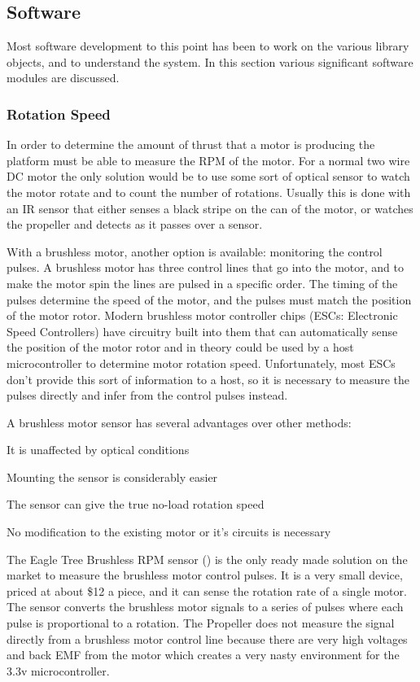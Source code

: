 \documentclass{article}
\numberwithin{equation}{section} %
\begin{document}
\subsection{Software}
Most software development to this point has been to work on the various library objects, and to understand the system. In this section various significant software modules are discussed.
\subsubsection{Rotation Speed}
In order to determine the amount of thrust that a motor is producing the platform must be able to measure the RPM of the motor. For a normal two wire DC motor the only solution would be to use some sort of optical sensor to watch the motor rotate and to count the number of rotations. Usually this is done with an IR sensor that either senses a black stripe on the can of the motor, or watches the propeller and detects as it passes over a sensor. 

With a brushless motor, another option is available: monitoring the control pulses. A brushless motor has three control lines that go into the motor, and to make the motor spin the lines are pulsed in a specific order. The  timing of the pulses determine the speed of the motor, and the pulses must match the position of the motor rotor. Modern brushless motor controller chips (ESCs: Electronic Speed Controllers) have circuitry built into them that can automatically sense the position of the motor rotor and in theory could be used by a host microcontroller to determine motor rotation speed. Unfortunately, most ESCs don't provide this sort of information to a host, so it is necessary to measure the pulses directly and infer from the control pulses instead. 

A brushless motor sensor has several advantages over other methods:
\begin{list}{*}{}
	\item It is unaffected by optical conditions
	\item Mounting the sensor is considerably easier
	\item The sensor can give the true no-load rotation speed
	\item No modification to the existing motor or it's circuits is necessary
\end{list}

The Eagle Tree Brushless RPM sensor (\cite{eaglerpm}) is the only ready made solution on the market to measure the brushless motor control pulses. It is a very small device, priced at about \$12 a piece, and it can sense the rotation rate of a single motor. The sensor converts the brushless motor signals to a series of pulses where each pulse is proportional to a rotation. The Propeller does not measure the signal directly from a brushless motor control line because there are very high voltages and back EMF from the motor which creates a very nasty environment for the 3.3v microcontroller.
\end{document}
